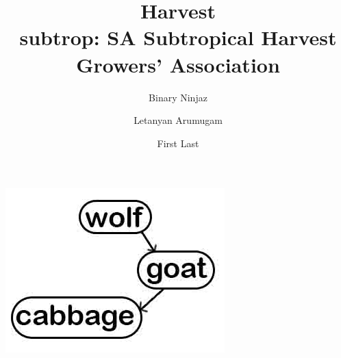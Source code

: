 \documentclass[12pt]{article}
\title{Harvest \\
\large subtrop: SA Subtropical Harvest Growers' Association
}
\author{Binary Ninjaz \and Letanyan Arumugam \and First Last}
\date{}
\begin{document}
	\maketitle
	\begin{center}
	\includegraphics{team}	
	\end{center}
	

	\newpage
	
	
	
\end{document}
